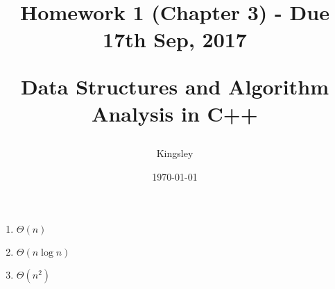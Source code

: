 \documentclass[titlepage]{article}
\title{
Homework 1 (Chapter 3) - Due 17th Sep, 2017\\
\begin{large}
Data Structures and Algorithm Analysis in C++
\end{large}
}
\author{Kingsley}
\date{\today}
\begin{document}
\maketitle

\begin{enumerate}[label=(\alph*)]
\item $\Theta(n)$
\item $\Theta(n\log n)$
\item $\Theta(n^2)$
\end{enumerate}
\end{document}
